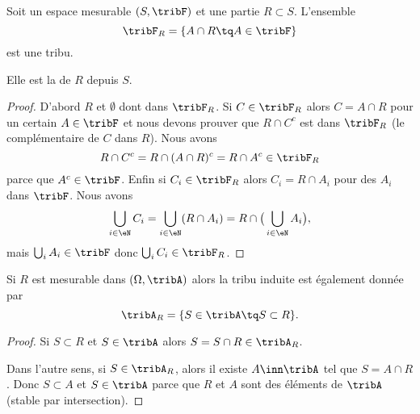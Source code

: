 \begin{propositionDef}      \label{DefDHTTooWNoKDP}
    Soit un espace mesurable \( (S,\tribF)  \) et une partie \( R\subset S\). L'ensemble
    \begin{equation}
        \tribF_R=\{ A\cap R\tq A\in\tribF \}
    \end{equation}
    est une tribu.

    Elle est la  de \( R\) depuis \( S\).
\end{propositionDef}

\begin{proof}
    D'abord \( R\) et \( \emptyset\) dont dans \( \tribF_R\). Si \( C\in\tribF_R \) alors \( C=A\cap R\) pour un certain \( A\in \tribF\) et nous devons prouver que \( R\cap C^c\) est dans \( \tribF_R\) (le complémentaire de \( C\) dans \( R\)). Nous avons
    \begin{equation}
        R\cap C^c=R\cap(A\cap R)^c=R\cap A^c\in \tribF_R
    \end{equation}
    parce que \( A^c\in \tribF\). Enfin si \( C_i\in \tribF_R\) alors \( C_i=R\cap A_i\) pour des \( A_i\) dans \( \tribF\). Nous avons
    \begin{equation}
        \bigcup_{i\in \eN}C_i=\bigcup_{i\in \eN}(R\cap A_i)=R\cap\big( \bigcup_{i\in \eN}A_i \big),
    \end{equation}
    mais \( \bigcup_iA_i \in \tribF\) donc \( \bigcup_iC_i\in \tribF_R\).
\end{proof}

\begin{proposition}
    Si \( R\) est mesurable dans \( (\Omega,\tribA)\) alors la tribu induite est également donnée par
    \begin{equation}
        \tribA_R=\{ S\in\tribA\tq S\subset R \}.
    \end{equation}
\end{proposition} 

\begin{proof}
    Si \( S\subset R\) et \( S\in \tribA\) alors \( S=S\cap R\in\tribA_R\).

    Dans l'autre sens, si \( S\in \tribA_R\), alors il existe \( A\inn\tribA\) tel que \( S=A\cap R\). Donc \( S\subset A\) et \( S\in\tribA\) parce que \( R\) et \( A\) sont des éléments de \( \tribA\) (stable par intersection).
\end{proof}

